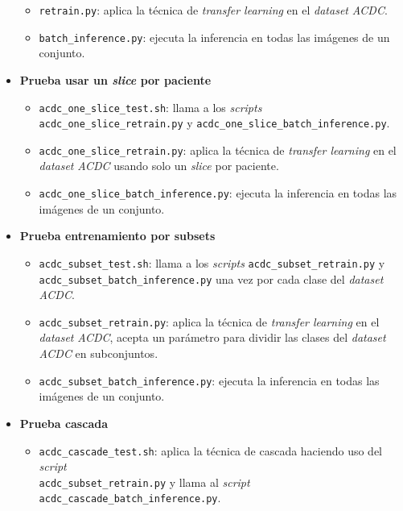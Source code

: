\documentclass[12pt,a4paper]{article}
\begin{document}
\begin{itemize}
\begin{itemize}
\item \texttt{retrain.py}: aplica la técnica de \textit{transfer learning} en el \textit{dataset} \textit{ACDC}.

\item \texttt{batch\_inference.py}: ejecuta la inferencia en todas las imágenes de un conjunto.
\end{itemize}


\item \textbf{Prueba usar un \textit{slice} por paciente}

\begin{itemize}
\item \texttt{acdc\_one\_slice\_test.sh}: llama a los \textit{scripts} \texttt{acdc\_one\_slice\_retrain.py} y \texttt{acdc\_one\_slice\_batch\_inference.py}.

\item \texttt{acdc\_one\_slice\_retrain.py}: aplica la técnica de \textit{transfer learning} en el \textit{dataset} \textit{ACDC} usando solo un \textit{slice} por paciente.

\item \texttt{acdc\_one\_slice\_batch\_inference.py}: ejecuta la inferencia en todas las imágenes de un conjunto.
\end{itemize}


\item \textbf{Prueba entrenamiento por subsets}

\begin{itemize}
\item \texttt{acdc\_subset\_test.sh}: llama a los \textit{scripts} \texttt{acdc\_subset\_retrain.py} y \\ \texttt{acdc\_subset\_batch\_inference.py} una vez por cada clase del \textit{dataset} \textit{ACDC}.

\item \texttt{acdc\_subset\_retrain.py}: aplica la técnica de \textit{transfer learning} en el \textit{dataset} \textit{ACDC}, acepta un parámetro para dividir las clases del \textit{dataset} \textit{ACDC} en subconjuntos.

\item \texttt{acdc\_subset\_batch\_inference.py}: ejecuta la inferencia en todas las imágenes de un conjunto.
\end{itemize}


\item \textbf{Prueba cascada}

\begin{itemize}
\item \texttt{acdc\_cascade\_test.sh}: aplica la técnica de cascada haciendo uso del \textit{script} \\ \texttt{acdc\_subset\_retrain.py} y llama al \textit{script} \texttt{acdc\_cascade\_batch\_inference.py}.


\end{itemize}
\end{itemize}
\end{document}
